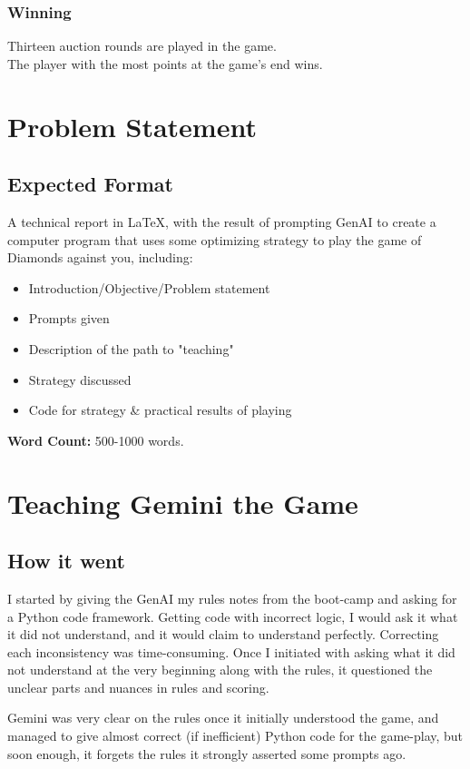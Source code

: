 \documentclass[runningheads]{llncs}
\begin{document}
\subsubsection{Winning}
\hfill \break
Thirteen auction rounds are played in the game.\\
The player with the most points at the game's end wins.

\section{Problem Statement}
\subsection{Expected Format}
A technical report in \LaTeX, with the result of prompting GenAI to create a computer program that uses some optimizing strategy to play the game of Diamonds against you, including:
\begin{itemize}
    \item Introduction/Objective/Problem statement
    \item Prompts given
    \item Description of the path to "teaching"
    \item Strategy discussed
    \item Code for strategy \& practical results of playing
\end{itemize}
\textbf{Word Count:} 500-1000 words.

\section{Teaching Gemini the Game}
\subsection{How it went}
I started by giving the GenAI my rules notes from the boot-camp and asking for a Python code framework. Getting code with incorrect logic, I would ask it what it did not understand, and it would claim to understand perfectly. Correcting each inconsistency was time-consuming. Once I initiated with asking what it did not understand at the very beginning along with the rules, it questioned the unclear parts and nuances in rules and scoring.

Gemini was very clear on the rules once it initially understood the game, and managed to give almost correct (if inefficient) Python code for the game-play, but soon enough, it forgets the rules it strongly asserted some prompts ago.
\end{document}
